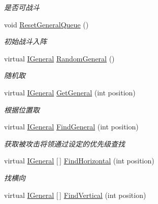 \begin{DoxyCompactItemize}
\begin{DoxyCompactList}\small\item\em 是否可战斗 \end{DoxyCompactList}\item 
void \mbox{\hyperlink{class_t_net_1_1_model_1_1_embattle_queue_ab9d37b32ea438064104532f4ebecdb0e}{Reset\+General\+Queue}} ()
\begin{DoxyCompactList}\small\item\em 初始战斗入阵 \end{DoxyCompactList}\item 
virtual \mbox{\hyperlink{interface_t_net_1_1_model_1_1_i_general}{I\+General}} \mbox{\hyperlink{class_t_net_1_1_model_1_1_embattle_queue_a5f40c4b5d05e4267105f18bfbda5e1ec}{Random\+General}} ()
\begin{DoxyCompactList}\small\item\em 随机取 \end{DoxyCompactList}\item 
virtual \mbox{\hyperlink{interface_t_net_1_1_model_1_1_i_general}{I\+General}} \mbox{\hyperlink{class_t_net_1_1_model_1_1_embattle_queue_adfd1564b437f4b7b5338244f8e3655de}{Get\+General}} (int position)
\begin{DoxyCompactList}\small\item\em 根据位置取 \end{DoxyCompactList}\item 
virtual \mbox{\hyperlink{interface_t_net_1_1_model_1_1_i_general}{I\+General}} \mbox{\hyperlink{class_t_net_1_1_model_1_1_embattle_queue_a2d2d510eb2079c72f16a4474891128cb}{Find\+General}} (int position)
\begin{DoxyCompactList}\small\item\em 获取被攻击将领通过设定的优先级查找 \end{DoxyCompactList}\item 
virtual \mbox{\hyperlink{interface_t_net_1_1_model_1_1_i_general}{I\+General}} \mbox{[}$\,$\mbox{]} \mbox{\hyperlink{class_t_net_1_1_model_1_1_embattle_queue_ad4f666319179cad16ce6abcfb59bd646}{Find\+Horizontal}} (int position)
\begin{DoxyCompactList}\small\item\em 找横向 \end{DoxyCompactList}\item 
virtual \mbox{\hyperlink{interface_t_net_1_1_model_1_1_i_general}{I\+General}} \mbox{[}$\,$\mbox{]} \mbox{\hyperlink{class_t_net_1_1_model_1_1_embattle_queue_a9fe4efc081860df81e6bc760fe7cec43}{Find\+Vertical}} (int position)

\end{DoxyCompactItemize}

